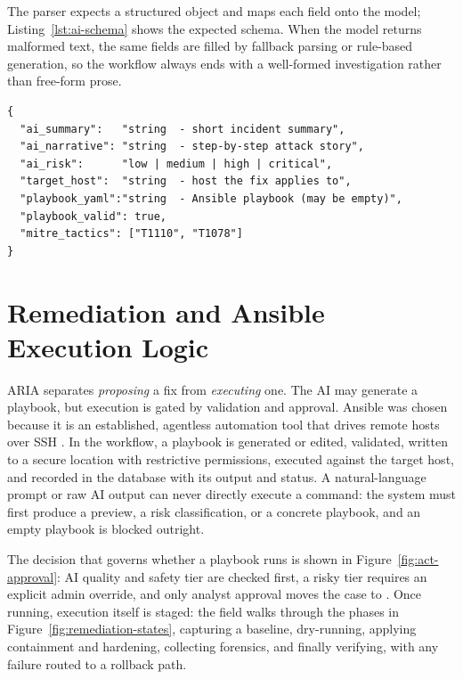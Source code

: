 The parser expects a structured object and maps each field onto the  model; Listing~\ref{lst:ai-schema} shows the expected schema. When the model returns malformed text, the same fields are filled by fallback parsing or rule-based generation, so the workflow always ends with a well-formed investigation rather than free-form prose.

\begin{lstlisting}[style=aria,caption={Expected structured AI response schema (mapped to the Investigation model)},label={lst:ai-schema}]
{
  "ai_summary":   "string  - short incident summary",
  "ai_narrative": "string  - step-by-step attack story",
  "ai_risk":      "low | medium | high | critical",
  "target_host":  "string  - host the fix applies to",
  "playbook_yaml":"string  - Ansible playbook (may be empty)",
  "playbook_valid": true,
  "mitre_tactics": ["T1110", "T1078"]
}
\end{lstlisting}

\section{Remediation and Ansible Execution Logic}

ARIA separates \emph{proposing} a fix from \emph{executing} one. The AI may generate a playbook, but execution is gated by validation and approval. Ansible was chosen because it is an established, agentless automation tool that drives remote hosts over SSH \cite{ansible_docs}. In the workflow, a playbook is generated or edited, validated, written to a secure location with restrictive permissions, executed against the target host, and recorded in the database with its output and status. A natural-language prompt or raw AI output can never directly execute a command: the system must first produce a preview, a risk classification, or a concrete playbook, and an empty playbook is blocked outright.

The decision that governs whether a playbook runs is shown in Figure~\ref{fig:act-approval}: AI quality and safety tier are checked first, a risky tier requires an explicit admin override, and only analyst approval moves the case to . Once running, execution itself is staged: the  field walks through the phases in Figure~\ref{fig:remediation-states}, capturing a baseline, dry-running, applying containment and hardening, collecting forensics, and finally verifying, with any failure routed to a rollback path.

